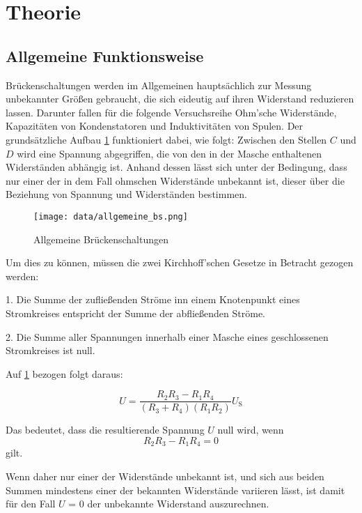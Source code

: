\section{Theorie}
\label{sec:Theorie}

\subsection{Allgemeine Funktionsweise}

Brückenschaltungen werden im Allgemeinen hauptsächlich zur Messung unbekannter Größen 
gebraucht, die sich eideutig auf ihren Widerstand reduzieren lassen. Darunter fallen für
die folgende Versuchsreihe Ohm'sche Widerstände, Kapazitäten von Kondenstatoren und 
Induktivitäten von Spulen. Der grundsätzliche Aufbau \ref{fig:allg} funktioniert dabei, wie folgt:
Zwischen den Stellen $C$ und $D$ wird eine Spannung abgegriffen, die von den in der Masche 
enthaltenen Widerständen abhängig ist. Anhand dessen lässt sich unter der Bedingung, dass 
nur einer der in dem Fall ohmschen Widerstände unbekannt ist, dieser über die Beziehung
von Spannung und Widerständen bestimmen. 
\begin{figure}
\centering
\texttt{[image: data/allgemeine\_bs.png]}
\caption{Allgemeine Brückenschaltungen}
\label{fig:allg}
\end{figure}

Um dies zu können, müssen die zwei Kirchhoff'schen Gesetze in Betracht gezogen werden:

1.  Die Summe der zufließenden Ströme inn einem Knotenpunkt eines Stromkreises entspricht
    der Summe der abfließenden Ströme.

2.  Die Summe aller Spannungen innerhalb einer Masche eines geschlossenen Stromkreises
    ist null.

Auf \ref{fig:allg} bezogen folgt daraus:

\begin{equation}
    U = \frac{{R_2}{R_3}-{R_1}{R_4}}{({R_3}+{R_4})({R_1}{R_2})}U_{\text{S}} 
\end{equation}

Das bedeutet, dass die resultierende Spannung $U$ null wird, wenn 
\begin{equation}
    R_2 R_3 - R_1 R_4 = 0
\end{equation}
gilt.

Wenn daher nur einer der Widerstände unbekannt ist, und sich aus beiden Summen mindestens einer
der bekannten Widerstände variieren lässt, ist damit für den Fall $U$ = 0 der unbekannte Widerstand
auszurechnen.

